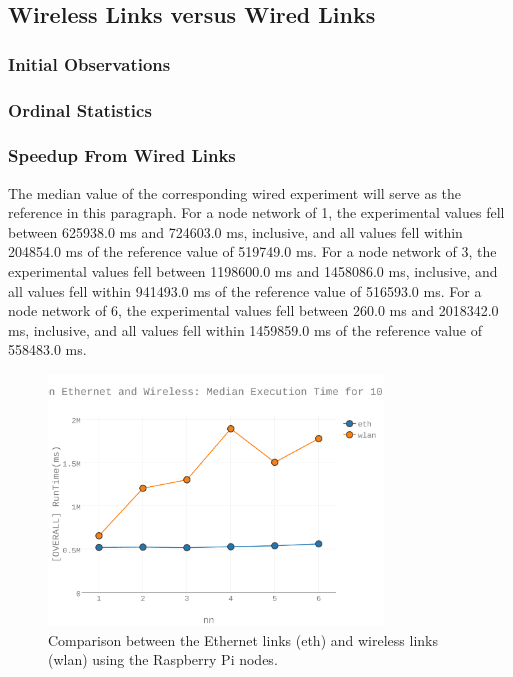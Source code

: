 \subsection{Wireless Links versus Wired Links}

\subsubsection{Initial Observations}

\subsubsection{Ordinal Statistics}

\subsubsection{Speedup From Wired Links}

The median value of the corresponding wired experiment will serve as the reference in this paragraph. For a node network of 1, the experimental values fell between 625938.0 ms and 724603.0 ms, inclusive, and all values fell within 204854.0 ms of the reference value of 519749.0 ms.  For a node network of 3, the experimental values fell between 1198600.0 ms and 1458086.0 ms, inclusive, and all values fell within 941493.0 ms of the reference value of 516593.0 ms.  For a node network of 6, the experimental values fell between 260.0 ms and 2018342.0 ms, inclusive, and all values fell within 1459859.0 ms of the reference value of 558483.0 ms.  

\begin{figure}[h]
\includegraphics[width=3.5in]{Figures/figures-wle_fig7.pdf}

\caption{Comparison between the Ethernet links (eth) and wireless links (wlan) using the Raspberry Pi nodes.}

\label{fig:fig07}
\end{figure}

